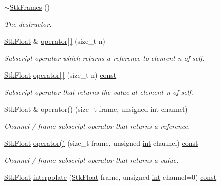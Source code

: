 \begin{DoxyCompactItemize}
\hyperlink{class_nyq_1_1_stk_frames_a87eeaf4d9ab8a8c7ae11d3664b4039de}{$\sim$\+Stk\+Frames} ()
\begin{DoxyCompactList}\small\item\em The destructor. \end{DoxyCompactList}\item 
\hyperlink{namespace_nyq_a044fa20a706520a617bbbf458a7db7e4}{Stk\+Float} \& \hyperlink{class_nyq_1_1_stk_frames_a8bad5a561f397ecde1d8a21153bd3813}{operator\mbox{[}$\,$\mbox{]}} (size\+\_\+t n)
\begin{DoxyCompactList}\small\item\em Subscript operator which returns a reference to element {\ttfamily n} of self. \end{DoxyCompactList}\item 
\hyperlink{namespace_nyq_a044fa20a706520a617bbbf458a7db7e4}{Stk\+Float} \hyperlink{class_nyq_1_1_stk_frames_ab89988ad85eda23a1502f35fe9c221ca}{operator\mbox{[}$\,$\mbox{]}} (size\+\_\+t n) \hyperlink{getopt1_8c_a2c212835823e3c54a8ab6d95c652660e}{const} 
\begin{DoxyCompactList}\small\item\em Subscript operator that returns the value at element {\ttfamily n} of self. \end{DoxyCompactList}\item 
\hyperlink{namespace_nyq_a044fa20a706520a617bbbf458a7db7e4}{Stk\+Float} \& \hyperlink{class_nyq_1_1_stk_frames_ad920c27b0959c50793145c3bfface405}{operator()} (size\+\_\+t frame, unsigned \hyperlink{xmltok_8h_a5a0d4a5641ce434f1d23533f2b2e6653}{int} channel)
\begin{DoxyCompactList}\small\item\em Channel / frame subscript operator that returns a reference. \end{DoxyCompactList}\item 
\hyperlink{namespace_nyq_a044fa20a706520a617bbbf458a7db7e4}{Stk\+Float} \hyperlink{class_nyq_1_1_stk_frames_ae2cbde3b8cdafaa6543013ccf4f25957}{operator()} (size\+\_\+t frame, unsigned \hyperlink{xmltok_8h_a5a0d4a5641ce434f1d23533f2b2e6653}{int} channel) \hyperlink{getopt1_8c_a2c212835823e3c54a8ab6d95c652660e}{const} 
\begin{DoxyCompactList}\small\item\em Channel / frame subscript operator that returns a value. \end{DoxyCompactList}\item 
\hyperlink{namespace_nyq_a044fa20a706520a617bbbf458a7db7e4}{Stk\+Float} \hyperlink{class_nyq_1_1_stk_frames_a213250356b07e9793d876a3e12413005}{interpolate} (\hyperlink{namespace_nyq_a044fa20a706520a617bbbf458a7db7e4}{Stk\+Float} frame, unsigned \hyperlink{xmltok_8h_a5a0d4a5641ce434f1d23533f2b2e6653}{int} channel=0) \hyperlink{getopt1_8c_a2c212835823e3c54a8ab6d95c652660e}{const} 

\end{DoxyCompactItemize}
